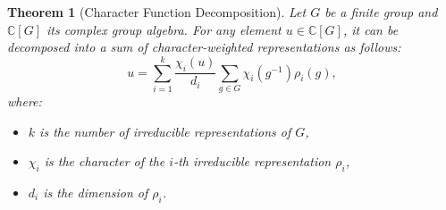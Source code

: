 \documentclass[11pt,a4paper]{article}
\newtheorem{theorem}{Theorem}
\begin{document}
\begin{theorem}[Character Function Decomposition]
\label{thm:char_decomp}
Let $G$ be a finite group and $\mathbb{C}[G]$ its complex group algebra. For any element $u \in \mathbb{C}[G]$, it can be decomposed into a sum of character-weighted representations as follows:
\begin{equation}
u = \sum_{i=1}^k \frac{\chi_i(u)}{d_i} \sum_{g \in G} \chi_i(g^{-1}) \rho_i(g),
\end{equation}
where:
\begin{itemize}
    \item $k$ is the number of irreducible representations of $G$,
    \item $\chi_i$ is the character of the $i$-th irreducible representation $\rho_i$,
    \item $d_i$ is the dimension of $\rho_i$.
\end{itemize}
\end{theorem}
\end{document}
